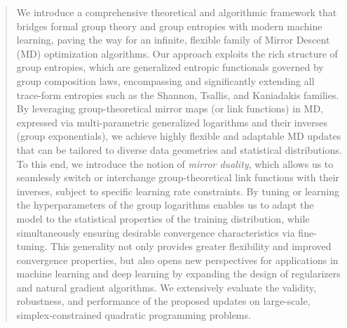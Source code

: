\documentclass[10pt]{amsart}
\theoremstyle{definition}
\theoremstyle{definition}	 %
\begin{document}
\begin{abstract}
We introduce a comprehensive theoretical and algorithmic framework that bridges formal group theory and group entropies with modern machine learning, paving the way for an infinite, flexible family of Mirror Descent (MD) optimization algorithms. Our approach exploits the rich structure of group entropies, which are generalized entropic functionals governed by group composition laws, encompassing and significantly extending all trace-form entropies such as the Shannon, Tsallis, and Kaniadakis families. By leveraging group-theoretical mirror maps (or link functions) in MD, expressed via multi-parametric generalized logarithms and their inverses (group exponentials), we achieve highly flexible and adaptable MD updates that can be tailored to diverse data geometries and statistical distributions. To this end, we introduce the notion of \textit{mirror duality}, which allows us to seamlessly switch or interchange group-theoretical link functions with their inverses, subject to specific learning rate constraints. By tuning or learning the hyperparameters of the group logarithms enables us to adapt the model to the statistical properties of the training distribution, while simultaneously ensuring desirable convergence characteristics via fine-tuning. This generality not only provides greater flexibility and improved convergence properties, but also opens new perspectives for applications in machine learning and deep learning by expanding the design of regularizers and natural gradient algorithms. We extensively evaluate the validity, robustness, and performance of the proposed updates on large-scale, simplex-constrained quadratic programming problems.
%

\end{abstract}
\end{document}
